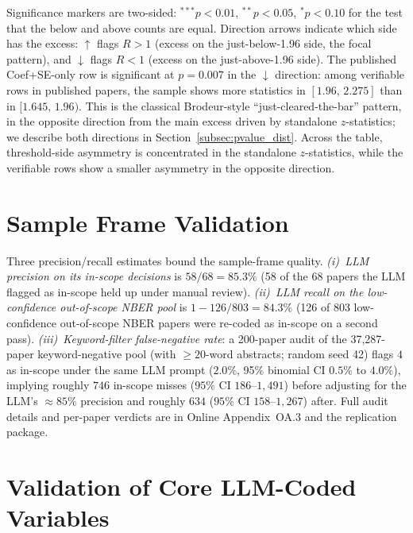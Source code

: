 \documentclass[12pt]{article}
\begin{document}
\begin{table}[ht]
\begin{singlespace}
\begin{minipage}{\textwidth}
Significance markers are two-sided: $^{***} p < 0.01$, $^{**} p < 0.05$,
$^{*} p < 0.10$ for the test that the below and above counts are equal.
Direction arrows indicate which side has the excess: $\uparrow$ flags
$R > 1$ (excess on the just-below-1.96 side, the focal pattern), and
$\downarrow$ flags $R < 1$ (excess on the just-above-1.96 side).  The
published Coef+SE-only row is significant at $p = 0.007$ in the
$\downarrow$ direction: among verifiable rows in published papers, the
sample shows more statistics in $[1.96,\,2.275]$ than in $[1.645,\,1.96)$.
This is the classical Brodeur-style ``just-cleared-the-bar'' pattern, in
the opposite direction from the main excess driven by standalone
$z$-statistics; we describe both directions in
Section~\ref{subsec:pvalue_dist}.  Across the table, threshold-side
asymmetry is concentrated in the standalone $z$-statistics, while the
verifiable rows show a smaller asymmetry in the opposite direction.
\end{minipage}
\end{singlespace}
\end{table}

\section{Sample Frame Validation}

Three precision/recall estimates bound the sample-frame quality.
\textit{(i)~LLM precision on its in-scope decisions} is $58/68 = 85.3\%$
(58 of the 68 papers the LLM flagged as in-scope held up under manual
review).  \textit{(ii)~LLM recall on the low-confidence out-of-scope
NBER pool} is $1 - 126/803 = 84.3\%$ (126 of 803 low-confidence
out-of-scope NBER papers were re-coded as in-scope on a second pass).
\textit{(iii)~Keyword-filter false-negative rate}: a 200-paper audit of
the 37,287-paper keyword-negative pool (with $\geq 20$-word abstracts;
random seed 42) flags $4$ as in-scope under the same LLM prompt
($2.0\%$, 95\% binomial CI $0.5\%$ to $4.0\%$), implying roughly $746$
in-scope misses ($95\%$ CI $186$--$1{,}491$) before adjusting for the
LLM's $\approx 85\%$ precision and roughly $634$ ($95\%$ CI
$158$--$1{,}267$) after.  Full audit details and per-paper verdicts
are in Online Appendix~OA.3 and the replication package.

\section{Validation of Core LLM-Coded Variables}
\label{app:core_var_validation}
\end{document}
